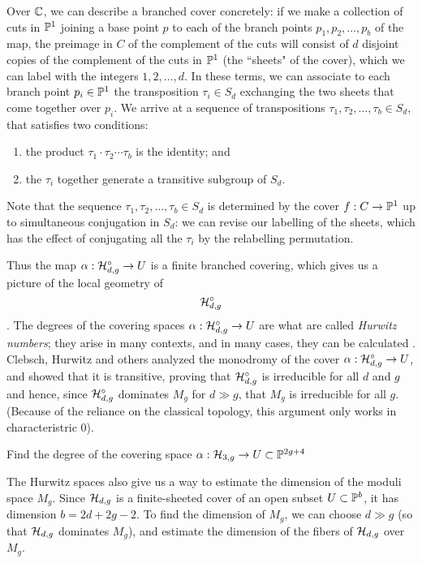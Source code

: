 Over ${\mathbb C}$, we can describe a branched cover concretely: if we make a collection of cuts in ${\mathbb P}^1$ joining a base point $p$ to each of the branch points $p_1, p_2, \dots, p_b$ of the map, the preimage in $C$ of the complement of the cuts will consist of $d$ disjoint copies of the complement of the cuts in ${\mathbb P}^1$ (the ``sheets" of the cover), which we can label with the integers $1, 2, \dots, d$. In these terms, we can associate to each branch point $p_i \in {\mathbb P}^1$ the transposition $\tau_i \in S_d$ exchanging the two sheets that come together over $p_i$. We arrive at a sequence of transpositions $\tau_1, \tau_2, \dots, \tau_b \in S_d$, that satisfies two conditions:

\begin{enumerate}
\item the product $\tau_1\cdot \tau_2 \cdots \tau_b$ is the identity; and
\item the $\tau_i$ together generate a transitive subgroup of $S_d$.
\end{enumerate}

Note that the sequence $\tau_1, \tau_2, \dots, \tau_b \in S_d$ is determined by the cover $f : C \to {\mathbb P}^1$ up to simultaneous conjugation in $S_d$: we can revise our labelling of the sheets, which has the effect of conjugating all the $\tau_i$ by the relabelling permutation.

Thus the map $\alpha : {\cal H}^\circ_{d,g} \to U$ is a finite branched covering, which gives us a picture of the local geometry of $${\cal H}^\circ_{d,g}$$. 
The degrees of the covering spaces $\alpha : {\cal H}^\circ_{d,g} \to U$ are what are called \emph{Hurwitz numbers}; they arise in many contexts, and in many cases, they can be calculated \cite{Graber-Vakil}. Clebsch, Hurwitz and others analyzed the monodromy of the cover $\alpha : {\cal H}^\circ_{d,g} \to U$, and showed that it is transitive, proving that ${\cal H}^\circ_{d,g}$ is irreducible for all $d$ and $g$ and hence, since ${\cal H}^\circ_{d,g}$ dominates $M_g$ for $d \gg g$, that $M_g$ is irreducible for all $g$. (Because of the reliance on the classical topology, this argument only works in characteristric 0).
\begin{exercise}
Find the degree of the covering space $\alpha : {\cal H}_{3,g} \to U \subset {\mathbb P}^{2g+4}$
\end{exercise}

The Hurwitz spaces also give us a way to estimate the dimension of the moduli space $M_g$. Since ${\cal H}_{d,g}$ is a finite-sheeted cover of an open subset $U \subset {\mathbb P}^b$, it has dimension  $b = 2d+2g-2$. To find the dimension of $M_g$, we can choose $d \gg g$ (so that ${\cal H}_{d,g}$ dominates $M_g$), and estimate the dimension of the fibers of ${\cal H}_{d,g}$ over $M_g$.

